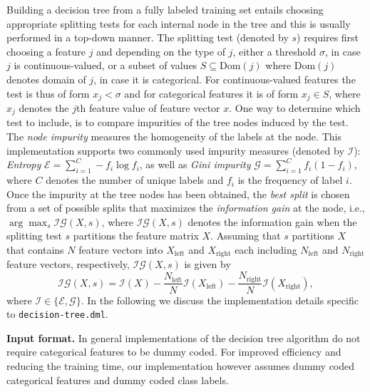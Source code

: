 Building a decision tree from a fully labeled training set entails
choosing appropriate splitting tests for each internal node in the tree and this is usually performed in a top-down manner. 
The splitting test (denoted by $s$) requires
first choosing a feature $j$ and depending on the type of $j$, either
a threshold $\sigma$, in case $j$ is continuous-valued, or a subset of
values $S \subseteq \text{Dom}(j)$ where $\text{Dom}(j)$ denotes
domain of $j$, in case it is categorical. For continuous-valued
features the test is thus of form $x_j < \sigma$ and for categorical
features it is of form $x_j \in S$, where $x_j$ denotes the $j$th
feature value of feature vector $x$. One way to determine which test
to include, is to compare impurities of the tree nodes induced by the test.
The {\it node impurity} measures the homogeneity of the labels at the node. This implementation supports two commonly used impurity measures (denoted by $\mathcal{I}$): {\it Entropy} $\mathcal{E}=\sum_{i=1}^{C}-f_i \log f_i$, as well as {\it Gini impurity} $\mathcal{G}=\sum_{i=1}^{C}f_i (1-f_i)$, where $C$ denotes the number of unique labels and $f_i$ is the frequency of label $i$.
Once the impurity at the tree nodes has been obtained, the {\it best split} is chosen from a set of possible splits that maximizes the {\it information gain} at the node, i.e., $\arg\max_{s}\mathcal{IG}(X,s)$, where $\mathcal{IG}(X,s)$ denotes the information gain when the splitting test $s$ partitions the feature matrix $X$. 
Assuming that $s$ partitions $X$ that contains $N$ feature vectors into $X_\text{left}$ and $X_\text{right}$ each including $N_\text{left}$ and $N_\text{right}$ feature vectors, respectively, $\mathcal{IG}(X,s)$ is given by 
\begin{equation*}
\mathcal{IG}(X,s)=\mathcal{I}(X)-\frac{N_\text{left}}{N}\mathcal{I}(X_\text{left})-\frac{N_\text{right}}{N}\mathcal{I}(X_\text{right}),
\end{equation*}
where $\mathcal{I}\in\{\mathcal{E},\mathcal{G}\}$.
In the following we discuss the implementation details specific to {\tt decision-tree.dml}. 


\textbf{Input format.} 
In general implementations of the decision tree algorithm do not require categorical features to be dummy coded. For improved efficiency and reducing the training time, our implementation however assumes dummy coded categorical features and dummy coded class labels.  


